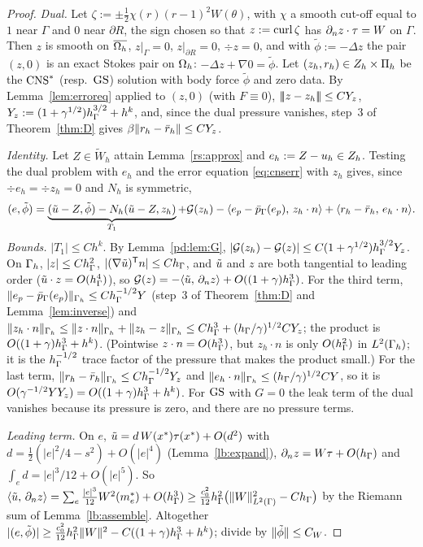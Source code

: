 \begin{proof}
\emph{Dual.} Let $\zeta:=\pm\frac12\chi(r)(r-1)^2W(\theta)$, with $\chi$ a smooth cut-off equal to $1$ near $\Gamma$ and $0$ near $\partial R$, the sign chosen so that $z:=\operatorname{curl}\zeta$ has $\partial_n z\cdot\tau=W$ on $\Gamma$. Then $z$ is smooth on $\overline{\Omega_h}$, $z|_\Gamma=0$, $z|_{\partial R}=0$, $\div z=0$, and with $\tilde\phi:=-\Delta z$ the pair $(z,0)$ is an exact Stokes pair on $\Omega_h$: $-\Delta z+\nabla0=\tilde\phi$. Let $(z_h,r_h)\in Z_h\times\Pi_h$ be the $\mathrm{CNS}^\ast$ (resp.\ $\mathrm{GS}$) solution with body force $\tilde\phi$ and zero data. By Lemma~\ref{lem:erroreq} applied to $(z,0)$ (with $F\equiv0$), $|\!|\!|z-z_h|\!|\!|\le CY_z$, $Y_z:=(1+\gamma^{1/2})h_\Gamma^{3/2}+h^k$, and, since the dual pressure vanishes, step~3 of Theorem~\ref{thm:D} gives $\beta\lVert r_h-\bar r_h\rVert\le CY_z$.

\emph{Identity.} Let $Z\in\tilde W_h$ attain Lemma~\ref{rs:approx} and $e_h:=Z-u_h\in Z_h$. Testing the dual problem with $e_h$ and the error equation \eqref{eq:cnserr} with $z_h$ gives, since $\div e_h=\div z_h=0$ and $N_h$ is symmetric,
\[
(e,\tilde\phi)=\underbrace{(\tilde u-Z,\tilde\phi)-N_h(\tilde u-Z,z_h)}_{T_1}+\mathcal G(z_h)-\langle e_p-\bar p_{\Gamma}(e_p),\, z_h\cdot n\rangle+\langle r_h-\bar r_h,\, e_h\cdot n\rangle.
\]
\emph{Bounds.} $|T_1|\le Ch^k$. By Lemma~\ref{pd:lem:G}, $|\mathcal G(z_h)-\mathcal G(z)|\le C(1+\gamma^{1/2})h_\Gamma^{3/2}Y_z$. On $\Gamma_h$, $|z|\le Ch_\Gamma^2$, $|(\nabla\tilde u)^{\mathsf T}n|\le Ch_\Gamma$, and $\tilde u$ and $z$ are both tangential to leading order ($\tilde u\cdot z=O(h_\Gamma^4)$), so $\mathcal G(z)=-\langle \tilde u,\, \partial_n z\rangle+O((1+\gamma)h_\Gamma^3)$. For the third term, $\lVert e_p-\bar p_{\Gamma}(e_p)\rVert_{\Gamma_h}\le Ch_\Gamma^{-1/2}Y$ (step~3 of Theorem~\ref{thm:D} and Lemma~\ref{lem:inverse}) and $\lVert z_h\cdot n\rVert_{\Gamma_h}\le\lVert z\cdot n\rVert_{\Gamma_h}+\lVert z_h-z\rVert_{\Gamma_h}\le Ch_\Gamma^3+(h_\Gamma/\gamma)^{1/2}CY_z$; the product is $O((1+\gamma)h_\Gamma^3+h^k)$. (Pointwise $z\cdot n=O(h_\Gamma^3)$, but $z_h\cdot n$ is only $O(h_\Gamma^2)$ in $L^2(\Gamma_h)$; it is the $h_\Gamma^{-1/2}$ trace factor of the pressure that makes the product small.) For the last term, $\lVert r_h-\bar r_h\rVert_{\Gamma_h}\le Ch_\Gamma^{-1/2}Y_z$ and $\lVert e_h\cdot n\rVert_{\Gamma_h}\le(h_\Gamma/\gamma)^{1/2}CY$, so it is $O(\gamma^{-1/2}YY_z)=O((1+\gamma)h_\Gamma^3+h^k)$. For $\mathrm{GS}$ with $G=0$ the leak term of the dual vanishes because its pressure is zero, and there are no pressure terms.

\emph{Leading term.} On $e$, $\tilde u=d\,W(x^\ast)\tau(x^\ast)+O(d^2)$ with $d=\frac12(|e|^2/4-s^2)+O(|e|^4)$ (Lemma~\ref{lb:expand}), $\partial_n z=W\tau+O(h_\Gamma)$ and $\int_ed=|e|^3/12+O(|e|^5)$. So $\langle \tilde u,\, \partial_n z\rangle=\sum_e\frac{|e|^3}{12}W^2(m_e^\ast)+O(h_\Gamma^3)\ge\frac{c_0^2}{12}h_\Gamma^2\bigl(\lVert W\rVert^2_{L^2(\Gamma)}-Ch_\Gamma\bigr)$ by the Riemann sum of Lemma~\ref{lb:assemble}. Altogether $|(e,\tilde\phi)|\ge\frac{c_0^2}{12}h_\Gamma^2\lVert W\rVert^2-C((1+\gamma)h_\Gamma^3+h^k)$; divide by $\lVert \tilde\phi\rVert\le C_W$.
\end{proof}

